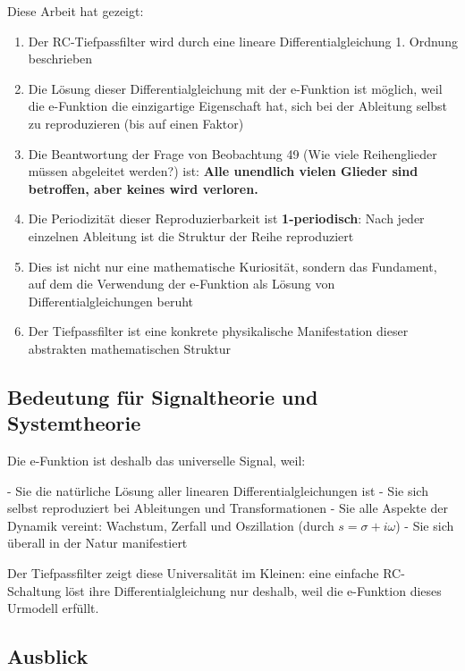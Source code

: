 \documentclass[a4paper,12pt,twoside]{report}
\theoremstyle{definition}
\begin{document}
Diese Arbeit hat gezeigt:

\begin{enumerate}
	\item Der RC-Tiefpassfilter wird durch eine lineare Differentialgleichung 1. Ordnung beschrieben
	
	\item Die Lösung dieser Differentialgleichung mit der e-Funktion ist möglich, weil die e-Funktion die einzigartige Eigenschaft hat, sich bei der Ableitung selbst zu reproduzieren (bis auf einen Faktor)
	
	\item Die Beantwortung der Frage von Beobachtung 49 (Wie viele Reihenglieder müssen abgeleitet werden?) ist: \textbf{Alle unendlich vielen Glieder sind betroffen, aber keines wird verloren.}
	
	\item Die Periodizität dieser Reproduzierbarkeit ist \textbf{1-periodisch}: Nach jeder einzelnen Ableitung ist die Struktur der Reihe reproduziert
	
	\item Dies ist nicht nur eine mathematische Kuriosität, sondern das Fundament, auf dem die Verwendung der e-Funktion als Lösung von Differentialgleichungen beruht
	
	\item Der Tiefpassfilter ist eine konkrete physikalische Manifestation dieser abstrakten mathematischen Struktur
\end{enumerate}

\subsection{Bedeutung für Signaltheorie und Systemtheorie}

Die e-Funktion ist deshalb das universelle Signal, weil:

- Sie die natürliche Lösung aller linearen Differentialgleichungen ist
- Sie sich selbst reproduziert bei Ableitungen und Transformationen
- Sie alle Aspekte der Dynamik vereint: Wachstum, Zerfall und Oszillation (durch $s = \sigma + i\omega$)
- Sie sich überall in der Natur manifestiert

Der Tiefpassfilter zeigt diese Universalität im Kleinen: eine einfache RC-Schaltung löst ihre Differentialgleichung nur deshalb, weil die e-Funktion dieses Urmodell erfüllt.

\subsection{Ausblick}
\end{document}
